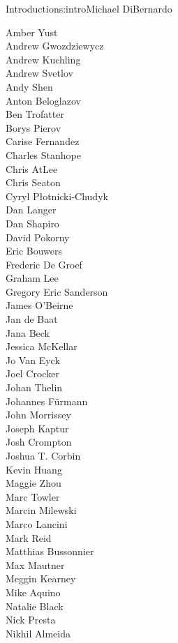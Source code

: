 \begin{aosachapter}{Introduction}{s:intro}{Michael DiBernardo}
\begin{multicols}{3}
\noindent Amber Yust \\
Andrew Gwozdziewycz \\
Andrew Kuchling \\
Andrew Svetlov \\
Andy Shen \\
Anton Beloglazov \\
Ben Trofatter \\
Borys Pierov \\
Carise Fernandez \\
Charles	Stanhope \\
Chris AtLee \\
Chris Seaton \\
Cyryl Płotnicki-Chudyk \\
Dan Langer \\
Dan Shapiro \\
David Pokorny \\
Eric Bouwers \\
Frederic De Groef \\
Graham Lee \\
Gregory Eric Sanderson \\
James O'Beirne \\
Jan de Baat \\
Jana Beck \\
Jessica McKellar \\
Jo Van Eyck \\
Joel Crocker \\
Johan Thelin \\
Johannes Fürmann \\
John Morrissey \\
Joseph Kaptur \\
Josh Crompton \\
Joshua T. Corbin \\
Kevin Huang \\
Maggie Zhou \\
Marc Towler \\
Marcin Milewski \\
Marco Lancini \\
Mark Reid \\
Matthias Bussonnier \\
Max Mautner \\
Meggin Kearney \\
Mike Aquino \\
Natalie	Black \\
Nick Presta \\
Nikhil Almeida \\

\end{multicols}
\end{aosachapter}
